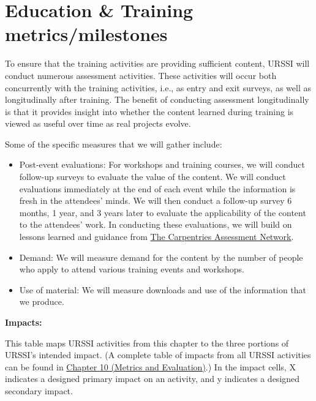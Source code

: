 \documentclass[
]{book}
\begin{document}
\hypertarget{education-training-metricsmilestones}{%
\section{Education \& Training metrics/milestones}\label{education-training-metricsmilestones}}

To ensure that the training activities are providing sufficient content, URSSI will conduct
numerous assessment activities. These activities will occur both concurrently with the
training activities, i.e., as entry and exit surveys, as well as longitudinally after
training. The benefit of conducting assessment longitudinally is that it provides insight
into whether the content learned during training is viewed as useful over time as real
projects evolve.

Some of the specific measures that we will gather include:

\begin{itemize}
\item
  Post-event evaluations: For workshops and training courses, we will conduct follow-up surveys
  to evaluate the value of the content. We will conduct evaluations immediately at the end of
  each event while the information is fresh in the attendees' minds. We will then conduct a
  follow-up survey 6 months, 1 year, and 3 years later to evaluate the applicability of the
  content to the attendees' work. In conducting these evaluations, we will build on lessons
  learned and guidance from \href{https://carpentries.org/assessment-network/}{The Carpentries Assessment Network}.
\item
  Demand: We will measure demand for the content by the number of people who apply to attend
  various training events and workshops.
\item
  Use of material: We will measure downloads and use of the information that we produce.
\end{itemize}

\textbf{Impacts:}

This table maps URSSI activities from this chapter to the three portions of URSSI's intended impact.
(A complete table of impacts from all URSSI activities can be found in \href{Ch-Metrics}{Chapter 10 (Metrics and Evaluation)}.)
In the impact cells, X indicates a designed primary impact on an activity, and y indicates
a designed secondary impact.
\end{document}
